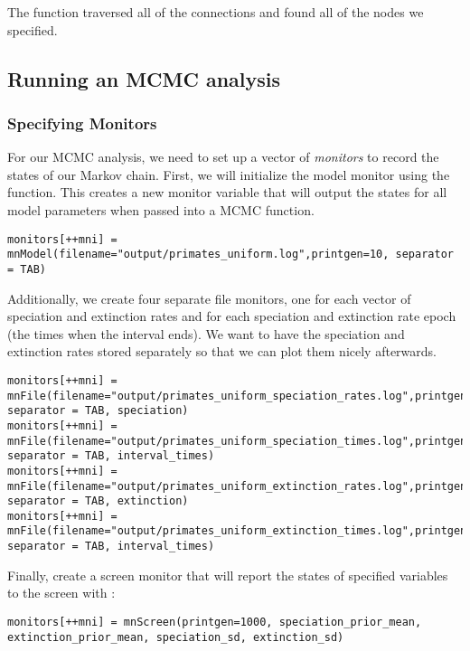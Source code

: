 The  function traversed all of the connections and found all of the nodes we specified. 


\subsection{Running an MCMC analysis}

\subsubsection{Specifying Monitors}

For our MCMC analysis, we need to set up a vector of \textit{monitors} to record the states of our Markov chain. 
First, we will initialize the model monitor using the  function. This creates a new monitor variable that will output the states for all model parameters when passed into a MCMC function. 
{\tt \begin{snugshade*}
\begin{lstlisting}
monitors[++mni] = mnModel(filename="output/primates_uniform.log",printgen=10, separator = TAB)
\end{lstlisting}
\end{snugshade*}}

Additionally, we create four separate file monitors, one for each vector of speciation and extinction rates and for each speciation and extinction rate epoch (\IE the times when the interval ends).
We want to have the speciation and extinction rates stored separately so that we can plot them nicely afterwards.
{\tt \begin{snugshade*}
\begin{lstlisting}
monitors[++mni] = mnFile(filename="output/primates_uniform_speciation_rates.log",printgen=10, separator = TAB, speciation)
monitors[++mni] = mnFile(filename="output/primates_uniform_speciation_times.log",printgen=10, separator = TAB, interval_times)
monitors[++mni] = mnFile(filename="output/primates_uniform_extinction_rates.log",printgen=10, separator = TAB, extinction)
monitors[++mni] = mnFile(filename="output/primates_uniform_extinction_times.log",printgen=10, separator = TAB, interval_times)
\end{lstlisting}
\end{snugshade*}}

Finally, create a screen monitor that will report the states of specified variables to the screen with :
{\tt \begin{snugshade*}
\begin{lstlisting}
monitors[++mni] = mnScreen(printgen=1000, speciation_prior_mean, extinction_prior_mean, speciation_sd, extinction_sd)
\end{lstlisting}
\end{snugshade*}}


